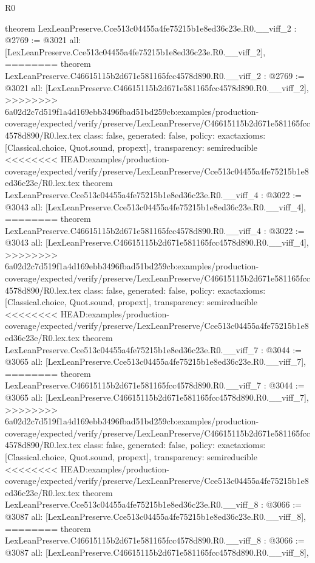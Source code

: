 \begin{lexlean}{R0}
\begin{coremodule}
{{{{{{{{{{{{{{{{{{{{{{{{{{{{{{{{{{{{{{{{{{{{{{{{{{{{{{{{{{{{{theorem LexLeanPreserve.Cce513c04455a4fe75215b1e8ed36c23e.R0.__viff_2 : @2769 := @3021 {
  all: [LexLeanPreserve.Cce513c04455a4fe75215b1e8ed36c23e.R0.__viff_2],
========
theorem LexLeanPreserve.C46615115b2d671e581165fcc4578d890.R0.__viff_2 : @2769 := @3021 {
  all: [LexLeanPreserve.C46615115b2d671e581165fcc4578d890.R0.__viff_2],
>>>>>>>> 6a02d2c7d519f1a4d169ebb3496fbad51bd259cb:examples/production-coverage/expected/verify/preserve/LexLeanPreserve/C46615115b2d671e581165fcc4578d890/R0.lex.tex
  class: false,
  generated: false,
  policy: exact{axioms: [Classical.choice, Quot.sound, propext]},
  transparency: semireducible
}
<<<<<<<< HEAD:examples/production-coverage/expected/verify/preserve/LexLeanPreserve/Cce513c04455a4fe75215b1e8ed36c23e/R0.lex.tex
theorem LexLeanPreserve.Cce513c04455a4fe75215b1e8ed36c23e.R0.__viff_4 : @3022 := @3043 {
  all: [LexLeanPreserve.Cce513c04455a4fe75215b1e8ed36c23e.R0.__viff_4],
========
theorem LexLeanPreserve.C46615115b2d671e581165fcc4578d890.R0.__viff_4 : @3022 := @3043 {
  all: [LexLeanPreserve.C46615115b2d671e581165fcc4578d890.R0.__viff_4],
>>>>>>>> 6a02d2c7d519f1a4d169ebb3496fbad51bd259cb:examples/production-coverage/expected/verify/preserve/LexLeanPreserve/C46615115b2d671e581165fcc4578d890/R0.lex.tex
  class: false,
  generated: false,
  policy: exact{axioms: [Classical.choice, Quot.sound, propext]},
  transparency: semireducible
}
<<<<<<<< HEAD:examples/production-coverage/expected/verify/preserve/LexLeanPreserve/Cce513c04455a4fe75215b1e8ed36c23e/R0.lex.tex
theorem LexLeanPreserve.Cce513c04455a4fe75215b1e8ed36c23e.R0.__viff_7 : @3044 := @3065 {
  all: [LexLeanPreserve.Cce513c04455a4fe75215b1e8ed36c23e.R0.__viff_7],
========
theorem LexLeanPreserve.C46615115b2d671e581165fcc4578d890.R0.__viff_7 : @3044 := @3065 {
  all: [LexLeanPreserve.C46615115b2d671e581165fcc4578d890.R0.__viff_7],
>>>>>>>> 6a02d2c7d519f1a4d169ebb3496fbad51bd259cb:examples/production-coverage/expected/verify/preserve/LexLeanPreserve/C46615115b2d671e581165fcc4578d890/R0.lex.tex
  class: false,
  generated: false,
  policy: exact{axioms: [Classical.choice, Quot.sound, propext]},
  transparency: semireducible
}
<<<<<<<< HEAD:examples/production-coverage/expected/verify/preserve/LexLeanPreserve/Cce513c04455a4fe75215b1e8ed36c23e/R0.lex.tex
theorem LexLeanPreserve.Cce513c04455a4fe75215b1e8ed36c23e.R0.__viff_8 : @3066 := @3087 {
  all: [LexLeanPreserve.Cce513c04455a4fe75215b1e8ed36c23e.R0.__viff_8],
========
theorem LexLeanPreserve.C46615115b2d671e581165fcc4578d890.R0.__viff_8 : @3066 := @3087 {
  all: [LexLeanPreserve.C46615115b2d671e581165fcc4578d890.R0.__viff_8],
}}}}}}}}}}}}}}}}}}}}}}}}}}}}}}}}}}}}}}}}}}}}}}}}}}}}}}}}}}}}}}}}}}
\end{coremodule}
\end{lexlean}
